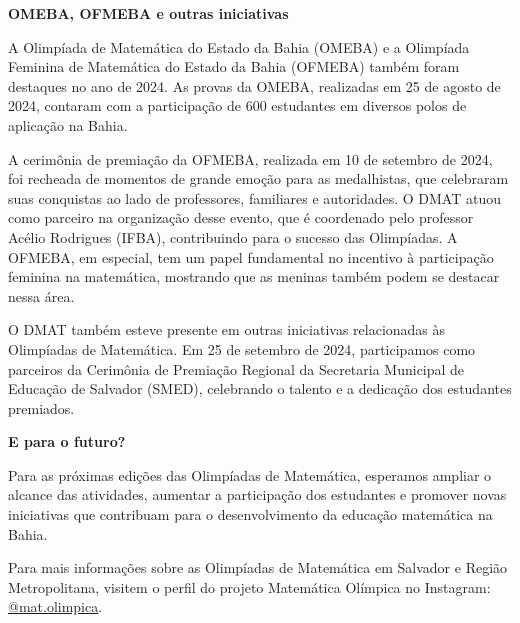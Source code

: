 \documentclass{hipatia}
\begin{document}
\vspace{0.5cm}

{\bf \noindent OMEBA, OFMEBA e outras iniciativas}

\vspace{0.5cm}

A Olimpíada de Matemática do Estado da Bahia (OMEBA) e a Olimpíada Feminina de Matemática do Estado da Bahia (OFMEBA) também foram destaques no ano de 2024. As provas da OMEBA, realizadas em 25 de agosto de 2024, contaram com a participação de 600 estudantes em diversos polos de aplicação na Bahia.

A cerimônia de premiação da OFMEBA, realizada em 10 de setembro de 2024, foi recheada de momentos de grande emoção para as medalhistas, que celebraram suas conquistas ao lado de professores, familiares e autoridades. O DMAT atuou como parceiro na organização desse evento, que é coordenado pelo professor Acélio Rodrigues (IFBA), contribuindo para o sucesso das Olimpíadas. A OFMEBA, em especial, tem um papel fundamental no incentivo à participação feminina na matemática, mostrando que as meninas também podem se destacar nessa área.

O DMAT também esteve presente em outras iniciativas relacionadas às Olimpíadas de Matemática. Em 25 de setembro de 2024, participamos como parceiros da Cerimônia de Premiação Regional da Secretaria Municipal de Educação de Salvador (SMED), celebrando o talento e a dedicação dos estudantes premiados.

\vspace{0.5cm}

{\bf \noindent E para o futuro?}

\vspace{0.5cm}

Para as próximas edições das Olimpíadas de Matemática, esperamos ampliar o alcance das atividades, aumentar a participação dos estudantes e promover novas iniciativas que contribuam para o desenvolvimento da educação matemática na Bahia.

Para mais informações sobre as Olimpíadas de Matemática em Salvador e Região Metropolitana, visitem o perfil do projeto Matemática Olímpica no Instagram: \href{https://www.instagram.com/mat.olimpica/#}{@mat.olimpica}.
\end{document}
